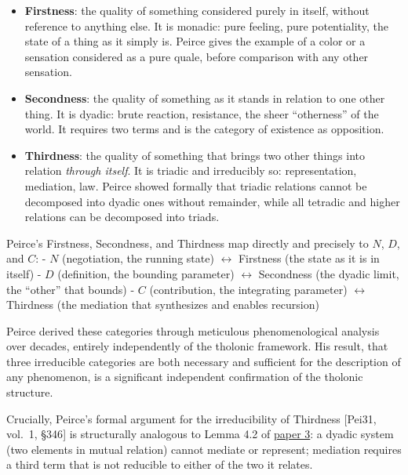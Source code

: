 \documentclass[12pt]{article}
\providecommand{\tightlist}{%
  \setlength{\itemsep}{0pt}\setlength{\parskip}{0pt}}
\begin{document}
\begin{itemize}
\tightlist
\item
  \textbf{Firstness}: the quality of something considered purely in
  itself, without reference to anything else. It is monadic: pure
  feeling, pure potentiality, the state of a thing as it simply is.
  Peirce gives the example of a color or a sensation considered as a
  pure quale, before comparison with any other sensation.
\item
  \textbf{Secondness}: the quality of something as it stands in relation
  to one other thing. It is dyadic: brute reaction, resistance, the
  sheer ``otherness'' of the world. It requires two terms and is the
  category of existence as opposition.
\item
  \textbf{Thirdness}: the quality of something that brings two other
  things into relation \emph{through itself}. It is triadic and
  irreducibly so: representation, mediation, law. Peirce showed formally
  that triadic relations cannot be decomposed into dyadic ones without
  remainder, while all tetradic and higher relations can be decomposed
  into triads.
\end{itemize}

Peirce's Firstness, Secondness, and Thirdness map directly and precisely
to \(N\), \(D\), and \(C\): - \(N\) (negotiation, the running state)
\(\leftrightarrow\) Firstness (the state as it is in itself) - \(D\)
(definition, the bounding parameter) \(\leftrightarrow\) Secondness (the
dyadic limit, the ``other'' that bounds) - \(C\) (contribution, the
integrating parameter) \(\leftrightarrow\) Thirdness (the mediation that
synthesizes and enables recursion)

Peirce derived these categories through meticulous phenomenological
analysis over decades, entirely independently of the tholonic framework.
His result, that three irreducible categories are both necessary and
sufficient for the description of any phenomenon, is a significant
independent confirmation of the tholonic structure.

Crucially, Peirce's formal argument for the irreducibility of Thirdness
{[}Pei31, vol.~1, §346{]} is structurally analogous to Lemma 4.2 of
\href{https://github.com/baardev/truevalue/blob/main/docnav/Research/papers/3_minimal-recursive-triadic-framework/3_minimal-recursive-triadic-framework.pdf}{paper
3}: a dyadic system (two elements in mutual relation) cannot mediate or
represent; mediation requires a third term that is not reducible to
either of the two it relates.
\end{document}

